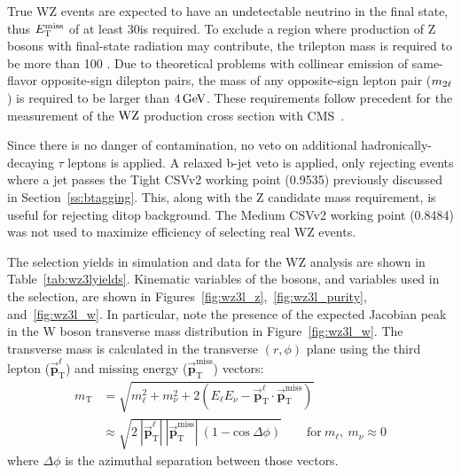 True WZ events are expected to have an undetectable neutrino in the final state, thus $E_\mathrm{T}^{\mathrm{miss}}$ of at least 30\GeV is required.
To exclude a region where production of Z bosons with final-state radiation may contribute, the trilepton mass is required to be more than 100 \GeV.
Due to theoretical problems with collinear emission of same-flavor opposite-sign dilepton pairs, the mass of any opposite-sign lepton pair ($m_{2\ell}$) is required to be larger than $4\,\text{Ge\hspace{-.08em}V}$.
These requirements follow precedent for the measurement of the $\mathrm{W}\mathrm{Z}$ production cross section with CMS~\cite{Khachatryan:2016tgp}.

Since there is no danger of contamination, no veto on additional hadronically-decaying $\tau$ leptons is applied.
A relaxed b-jet veto is applied, only rejecting events where a jet passes the Tight CSVv2 working point (0.9535) previously discussed in Section~\ref{ss:btagging}.
This, along with the Z candidate mass requirement, is useful for rejecting ditop background.
The Medium CSVv2 working point (0.8484) was not used to maximize efficiency of selecting real WZ events.

The selection yields in simulation and data for the WZ analysis are shown in Table~\ref{tab:wz3lyields}.
Kinematic variables of the bosons, and variables used in the selection, are shown in Figures~\ref{fig:wz3l_z},~\ref{fig:wz3l_purity}, and~\ref{fig:wz3l_w}.
In particular, note the presence of the expected Jacobian peak in the W boson transverse mass distribution in Figure~\ref{fig:wz3l_w}.
The transverse mass is calculated in the transverse $(r,\phi)$ plane using the 
third lepton ($\vec{\mathbf{p}}_\mathrm{T}^\ell$) and missing energy ($\vec{\mathbf{p}}_\mathrm{T}^\mathrm{miss}$) vectors:
\begin{equation}
\label{eq:mt}
\begin{split}
m_\mathrm{T} & = \sqrt{m_\ell^2 + m_\nu^2 + 2(E_\ell E_\nu -\vec{\mathbf{p}}_\mathrm{T}^\ell \cdot \vec{\mathbf{p}}_\mathrm{T}^\mathrm{miss})} \\ 
& \approx \sqrt{2\:|\vec{\mathbf{p}}_\mathrm{T}^\ell|\:|\vec{\mathbf{p}}_\mathrm{T}^\mathrm{miss}|\:(1 - \mathrm{cos}\:\Delta\phi)} \qquad \mathrm{for}\:m_\ell,\:m_\nu\approx0
\end{split}
\end{equation}
where $\Delta\phi$ is the azimuthal separation between those vectors.


